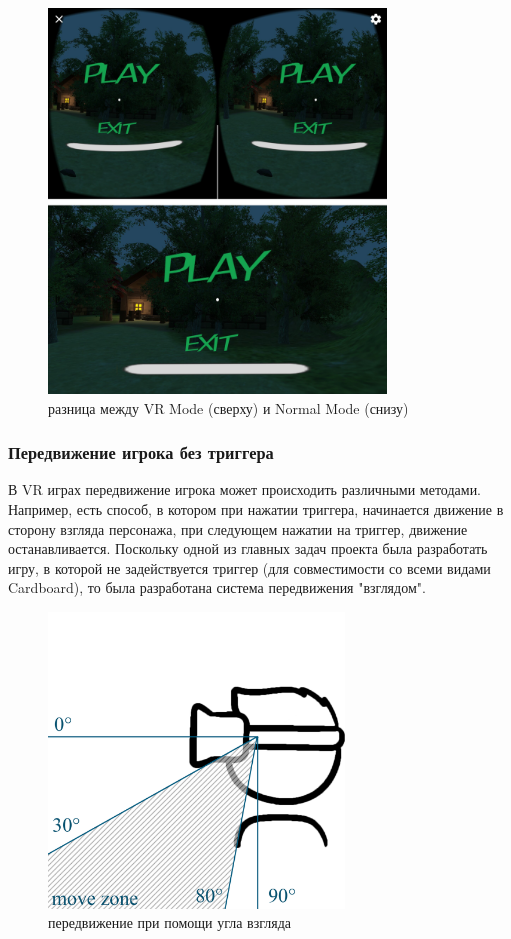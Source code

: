 \begin{figure}[h!]
	\centering
	\includegraphics[width=0.8\textwidth]{./screenshots/diff.jpg}
	\caption{\small{разница между VR Mode (сверху) и Normal Mode (снизу)}}
	\label{diff}
\end{figure}
\newpage
\subsubsection{Передвижение игрока без триггера}
\tab[0.75cm]В VR играх передвижение игрока может происходить различными методами. Например, 
есть способ, в котором при нажатии триггера, начинается движение в сторону 
взгляда персонажа, при следующем нажатии на триггер, движение останавливается. 
Поскольку одной из главных задач проекта была разработать игру, в которой не 
задействуется триггер (для совместимости со всеми видами Cardboard), то была 
разработана система передвижения "взглядом".

\newpage

\begin{figure}[h!]
    \centering
    \includegraphics[width=0.7\textwidth]{./pics/vrAngles.png}
    \caption{\small{передвижение при помощи угла взгляда}}
    \label{move_angles}
\end{figure}

